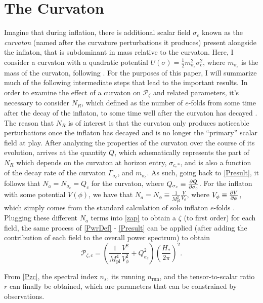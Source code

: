 \documentclass[12pt]{article}
\begin{document}
\section{The Curvaton}\label{curvatonsection}
\par Imagine that during inflation, there is additional scalar field $\sigma_c$ known as the \textit{curvaton} (named after the curvature perturbations it produces) present alongside the inflaton, that is subdominant in mass relative to the curvaton. Here, I consider a curvaton with a quadratic potential $U(\sigma)=\frac{1}{2}m_{\sigma_c}^2\sigma_c^2$, where $m_{\sigma_c}$ is the mass of the curvaton, following \cite{curvaton}. For the purposes of this paper, I will summarize much of the following intermediate steps that lead to the important results. In order to examine the effect of a curvaton on $\mathcal{P}_\zeta$ and related parameters, it's necessary to consider $N_R$, which defined as the number of $e$-folds from some time after the decay of the inflaton, to some time well after the curvaton has decayed \cite{curvaton}. The reason that $N_R$ is of interest is that the curvaton only produces noticeable perturbations once the inflaton has decayed and is no longer the ``primary'' scalar field at play. After analyzing the properties of the curvaton over the course of its evolution, \cite{curvaton} arrives at the quantity $Q$, which schematically represents the part of $N_R$ which depends on the curvaton at horizon entry, $\sigma_{c,*}$, and is also a function of the decay rate of the curvaton $\Gamma_{\sigma_c}$, and $m_{\sigma_c}$. As such, going back to \eqref{Presult}, it follows that $N_a=N_{\sigma_c}=Q_c$ for the curvaton, where $Q_{\sigma_c}\equiv\pdv{Q}{\sigma_c}$. For the inflaton with some potential $V(\phi)$, we have that $N_a=N_\phi\equiv \frac{1}{M_\text{pl}^2}\frac{V}{V_\phi}$, where $V_\phi\equiv\pdv{V}{\phi}$, which simply comes from the standard calculation of solo inflaton $e$-folds  \cite{curvaton}. Plugging these different $N_a$ terms into \eqref{zap} to obtain a $\zeta$ (to first order) for each field, the same process of \eqref{PwrDef} - \eqref{Presult} can be applied (after adding the contribution of each field to the overall power spectrum) to obtain 
\begin{equation}\label{Pzc}
    \mathcal{P}_{\zeta,c}=\left(\frac{1}{M_\text{pl}^4}\frac{V^2}{V^2_\phi}+Q_{\sigma_c}^2\right)\left(\frac{H_*}{2\pi}\right)^2.
\end{equation}
\par From \eqref{Pzc}, the spectral index $n_s$, its running $n_\text{run}$, and the tensor-to-scalar ratio $r$ can finally be obtained, which are parameters that can be constrained by observations.
\end{document}
